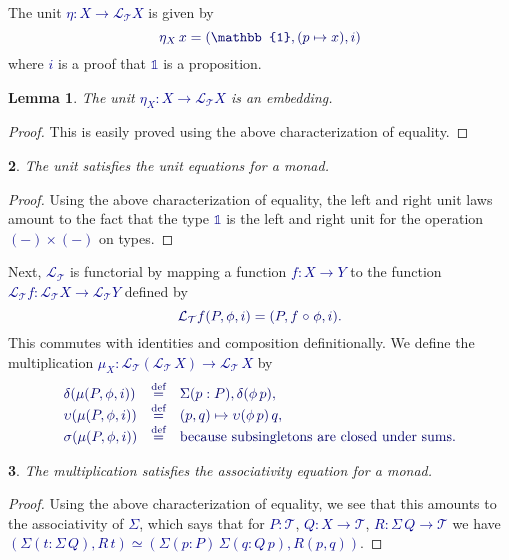 \documentclass[10pt]{article}
\newcommand{\db}{\textcolor{darkblue}}
\newcommand{\m}[1]{\db{$#1$}}
\newcommand{\M}[1]{\[\db{#1}\]}
\newcommand{\comp}{\mathrel{\circ}}
\newcommand{\U}{\mathcal{U}}
\newcommand{\V}{\mathcal{V}}
\newcommand{\T}{\mathcal{T}}
\newcommand{\Lift}{\mathcal{L}}
\newcommand{\One}{\mathbb{1}}
\newcommand{\eqdef}{\overset{\text{def}}{=}}
\newtheorem{numbered}{}
\newtheorem{lemma}[numbered]{Lemma}
\theoremstyle{definition}
\begin{document}
The unit \m{\eta : X
  \to \Lift_\T X} is given by \M{\eta_X \, x = (\One, (p \mapsto x), i)}
where \m{i} is a proof that \m{\One} is a proposition.
\begin{lemma}
  The unit \m{\eta_X : X\to\Lift_\T X} is an embedding.
\end{lemma}
\begin{proof}
  This is easily proved using the above characterization of equality.
\end{proof}
\begin{numbered}
  The unit satisfies the unit equations for a monad.
\end{numbered}
\begin{proof}
  Using the above characterization of equality, the left and right
  unit laws amount to the fact that the type \m{\One} is the left
  and right unit for the operation \m{(-)\times(-)} on types.
\end{proof}
\noindent Next, \m{\Lift_\T} is functorial by mapping a function
\m{f : X \to Y} to the function \m{\Lift_\T f : \Lift_\T X \to \Lift_\T Y}
defined by
%
\M{
\Lift_\T f (P , \phi , i) = (P , f \comp \phi , i).
}
%
This commutes with identities and composition definitionally.
%
%
We define the multiplication \m{\mu_X : \Lift_{\T} (\Lift_{\T}\, X) \to \Lift_{\T}\, X} by
%
\M{
  \begin{array}{lll}
  \delta (\mu (P , \phi , i)) & \eqdef & \Sigma (p : P), \delta (\phi \, p), \\
  \upsilon (\mu (P , \phi , i)) & \eqdef & (p , q) \mapsto \upsilon (\phi \, p) \, q , \\
  \sigma (\mu (P , \phi , i)) & \eqdef & \text{because subsingletons are closed under sums.} \\
  \end{array}
}
%
\begin{numbered}
  The multiplication satisfies the associativity equation for a monad.
\end{numbered}
\begin{proof}
  Using the above characterization of equality, we see that this
  amounts to the associativity of \m{\Sigma}, which says that for
  \m{P:\T}, \m{Q: X \to \T}, \m{R : \Sigma \, Q \to \T} we have
   \m{(\Sigma (t : \Sigma \, Q), R \, t) \simeq (\Sigma (p : P)\,
    \Sigma (q : Q \, p), R(p,q))}.
\end{proof}
\end{document}
